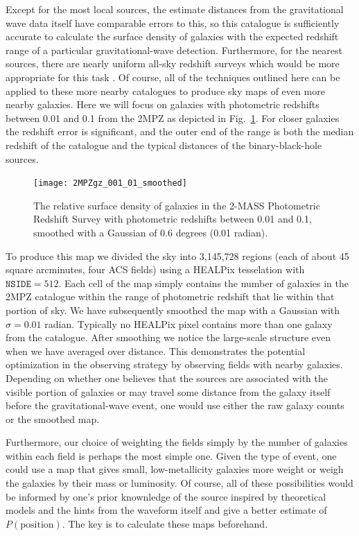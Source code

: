 \documentclass[useAMS,usenatbib]{mn2e}
\begin{document}
Except for the most local sources, the estimate distances from the
gravitational wave data itself have comparable errors to this, so this
catalogue is sufficiently accurate to calculate the surface density of
galaxies with the expected redshift range of a particular
gravitational-wave detection.  Furthermore, for the nearest sources,
there are nearly uniform all-sky redshift surveys which would be more
appropriate for this task
\citep[e.g]{2000MNRAS.317...55S,2012ApJS..199...26H}.  Of course, all
of the techniques outlined here can be applied to these more nearby
catalogues to produce sky maps of even more nearby galaxies.  Here we
will focus on galaxies with photometric redshifts between 0.01 and 0.1
from the 2MPZ as depicted in Fig.~\ref{fig:galmap}.  For closer
galaxies the redshift error is significant, and the outer end of the
range is both the median redshift of the catalogue and the typical
distances of the binary-black-hole sources.
\begin{figure}
  \texttt{[image: 2MPZgz\_001\_01\_smoothed]}
  \caption{The relative surface density of galaxies in the 2-MASS Photometric Redshift Survey with photometric redshifts between 0.01 and 0.1, smoothed with a Gaussian of 0.6 degrees (0.01 radian).}
  \label{fig:galmap}
\end{figure}

To produce this map we divided the sky into 3,145,728 regions (each of
about 45 square arcminutes, four ACS fields) using a HEALPix
\citep{2005ApJ...622..759G} tesselation with $\mathtt{NSIDE}=512$.
Each cell of the map simply contains the number of galaxies in the
2MPZ catalogue within the range of photometric redshift that lie
within that portion of sky.  We have subsequently smoothed the map
with a Gaussian with $\sigma=0.01$ radian.  Typically no HEALPix pixel
contains more than one galaxy from the catalogue.  After smoothing we
notice the large-scale structure even when we have averaged over
distance.  This demonstrates the potential optimization in the
observing strategy by observing fields with nearby galaxies. Depending
on whether one believes that the sources are associated with the
visible portion of galaxies or may travel some distance from the
galaxy itself before the gravitational-wave event, one would use
either the raw galaxy counts or the smoothed map.

Furthermore, our choice of weighting the fields simply by the number
of galaxies within each field is perhaps the most simple one.  Given
the type of event, one could use a map that gives small,
low-metallicity galaxies more weight or weigh the galaxies by their
mass or luminosity.  Of course, all of these possibilities would be
informed by one's prior knownledge of the source inspired by
theoretical models and the hints from the waveform itself and give a
better estimate of $P(\mathrm{position})$.  The key is to calculate these
maps beforehand.
\end{document}
